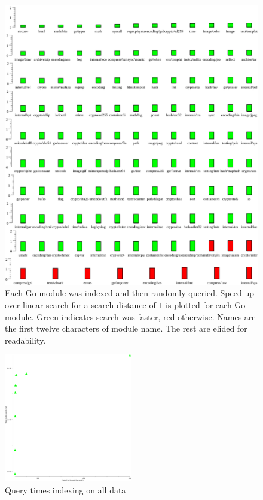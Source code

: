 \begin{figure}
    \includegraphics[width=\textwidth]{example1.png}
    \centering
    \caption{Each Go module was indexed and then randomly queried.
    Speed up over linear search for a search distance of $1$ is plotted for each Go module.
    Green indicates search was faster, red otherwise.
    Names are the first twelve characters of module name.
    The rest are elided for readability.}
    \label{dist1plot}
\end{figure}
\begin{figure}
    \includegraphics[width=0.5\textwidth]{alldat.png}
    \centering 
    \caption{Query times indexing on all data}
    \label{allplot}
\end{figure}